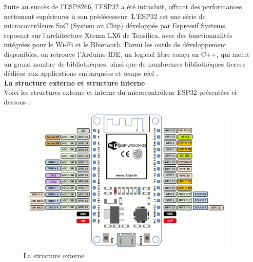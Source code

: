 Suite au succès de l'ESP8266, l'ESP32 a été introduit, offrant des performances nettement supérieures à son prédécesseur. L'ESP32 est une série de microcontrôleurs SoC (System on Chip) développée par Espressif Systems, reposant sur l'architecture Xtensa LX6 de Tensilica, avec des fonctionnalités intégrées pour le Wi-Fi et le Bluetooth. Parmi les outils de développement disponibles, on retrouve l'Arduino IDE, un logiciel libre conçu en C++, qui inclut un grand nombre de bibliothèques, ainsi que de nombreuses bibliothèques tierces dédiées aux applications embarquées et temps réel  \cite{5}.\\

\textbf{La structure externe et structure interne }\\
Voici les structures externe et interne du microcontrôleur ESP32 présentées ci-dessous :
\begin{figure}[H]
	\centering
	\includegraphics[width=15cm]{./img/composants/esp.png}
	\caption{La structure externe  \cite{8} }
	\label{i1}
\end{figure}



